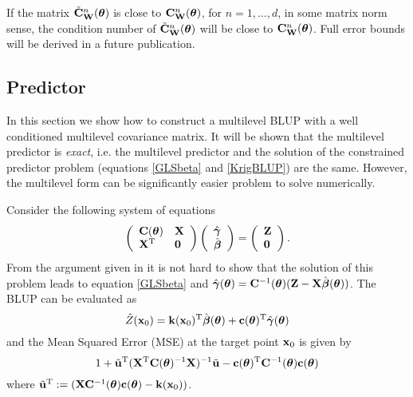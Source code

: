 \documentclass[11pt,final]{amsart}       %
\begin{document}
\begin{remark} If the matrix $\tilde {\mathbf{C}}^{n}_{\mathbf{W}}(\boldsymbol{\theta})$ is close 
to $\mathbf{C}^{n}_{\mathbf{W}}(\boldsymbol{\theta})$, for $n = 1,\dots,d$, in some matrix norm
sense, the condition number of $\tilde {\mathbf{C}}^{n}_{\mathbf{W}}(\boldsymbol{\theta})$ will be
close to $\mathbf{C}^{n}_{\mathbf{W}}(\boldsymbol{\theta})$. Full error bounds will be derived in
a future publication.
\end{remark}

\subsection{Predictor}
In this section we show how to construct a multilevel BLUP with a
well conditioned multilevel covariance matrix. It will be shown that
the multilevel predictor is \emph{exact}, i.e. the multilevel
predictor and the solution of the constrained predictor problem
(equations \eqref{GLSbeta} and \eqref{KrigBLUP}) are the same.
However, the multilevel form can be significantly easier problem to
solve numerically.

Consider the following system of equations
\begin{eqnarray}
\left( {{\begin{array}{*{20}c}
 \bC(\btheta) \hfill & \bX \hfill \\
 \bX\T \hfill & \0 \hfill \\
\end{array} }} \right)\left( {{\begin{array}{*{20}c}
 \hat \bgamma \hfill \\
 \hat \bbeta \hfill \\
\end{array} }} \right)=\left( {{\begin{array}{*{20}c}
 \bZ \hfill \\
 \0 \hfill \\
\end{array} }} \right).
\label{Kriging:problem}
\end{eqnarray}
From the argument given in \cite{Nielsen2002} it is not hard to show
that the solution of this problem leads to equation \eqref{GLSbeta}
and $\hat {\boldsymbol{\gamma}}(\boldsymbol{\theta}) = \mathbf{C}^{-1}(\boldsymbol{\theta})(\mathbf{Z} - \mathbf{X} \hat
{\boldsymbol{\beta}}(\boldsymbol{\theta}))$. The BLUP can be evaluated as
\begin{equation}
  \hat Z(\mathbf{x}_0)
  =\mathbf{k}(\mathbf{x}_0)^{\rm T}\hat {\boldsymbol{\beta}}(\boldsymbol{\theta})+\mathbf{c}(\boldsymbol{\theta})^{\rm T}
  \hat {\boldsymbol{\gamma}}(\boldsymbol{\theta})
\label{Kriging}
\end{equation}
and the Mean Squared Error (MSE) at the target point $\mathbf{x}_0$ is given by
\[
1 + 
\tilde{\mathbf{u}}
^{\rm T}
(\mathbf{X} ^{\rm T} 
\mathbf{C}(\boldsymbol{\theta})^{-1} \mathbf{X} )^{-1}
\tilde{\mathbf{u}}
-\mathbf{c}(\boldsymbol{\theta})^{\rm T}\mathbf{C}^{-1}(\boldsymbol{\theta})\mathbf{c}(\boldsymbol{\theta})
\]
where $\tilde{\mathbf{u}}^{\rm T} := (\mathbf{X} \mathbf{C}^{-1}(\boldsymbol{\theta})
\mathbf{c}(\boldsymbol{\theta}) - \mathbf{k}(\mathbf{x}_0))$.
\end{document}
